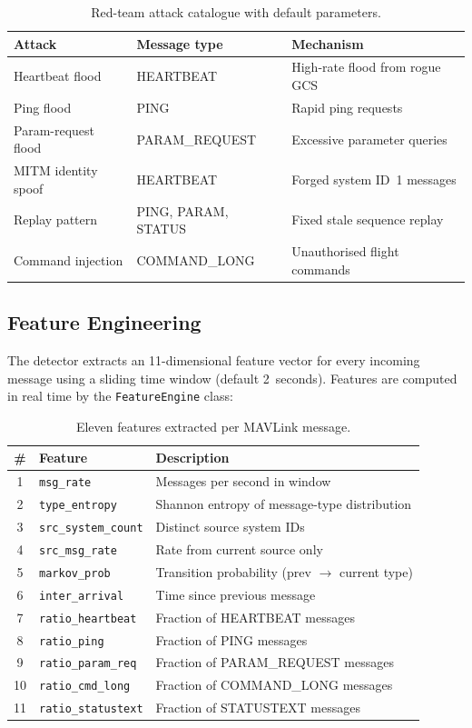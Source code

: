 \begin{table}[t]
\centering
\caption{Red-team attack catalogue with default parameters.}
\label{tab:attacks}
\renewcommand{\arraystretch}{1.15}
\begin{tabular}{lll}
\toprule
\textbf{Attack} & \textbf{Message type} & \textbf{Mechanism} \\
\midrule
Heartbeat flood & HEARTBEAT & High-rate flood from rogue GCS \\
Ping flood & PING & Rapid ping requests \\
Param-request flood & PARAM\_REQUEST & Excessive parameter queries \\
MITM identity spoof & HEARTBEAT & Forged system ID~1 messages \\
Replay pattern & PING, PARAM, STATUS & Fixed stale sequence replay \\
Command injection & COMMAND\_LONG & Unauthorised flight commands \\
\bottomrule
\end{tabular}
\end{table}

\subsection{Feature Engineering} \label{sec:features}

The detector extracts an 11-dimensional feature vector for every incoming message using a sliding time window (default 2~seconds).
Features are computed in real time by the \texttt{FeatureEngine} class:

\begin{table}[t]
\centering
\caption{Eleven features extracted per MAVLink message.}
\label{tab:features}
\renewcommand{\arraystretch}{1.15}
\begin{tabular}{clp{4.2cm}}
\toprule
\textbf{\#} & \textbf{Feature} & \textbf{Description} \\
\midrule
1 & \texttt{msg\_rate} & Messages per second in window \\
2 & \texttt{type\_entropy} & Shannon entropy of message-type distribution \\
3 & \texttt{src\_system\_count} & Distinct source system IDs \\
4 & \texttt{src\_msg\_rate} & Rate from current source only \\
5 & \texttt{markov\_prob} & Transition probability (prev $\to$ current type) \\
6 & \texttt{inter\_arrival} & Time since previous message \\
7 & \texttt{ratio\_heartbeat} & Fraction of HEARTBEAT messages \\
8 & \texttt{ratio\_ping} & Fraction of PING messages \\
9 & \texttt{ratio\_param\_req} & Fraction of PARAM\_REQUEST messages \\
10 & \texttt{ratio\_cmd\_long} & Fraction of COMMAND\_LONG messages \\
11 & \texttt{ratio\_statustext} & Fraction of STATUSTEXT messages \\
\bottomrule
\end{tabular}
\end{table}


